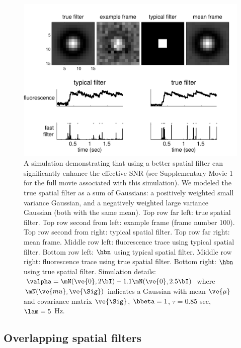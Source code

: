 \begin{figure}[h!]
\centering \includegraphics[width=.9\linewidth]{../figs/spatial2}
\caption{A simulation demonstrating that using a better spatial filter can significantly enhance the effective SNR (see Supplementary Movie 1 for the full movie associated with this simulation). We modeled the true spatial filter as a sum of Gaussians: a positively weighted small variance Gaussian, and a negatively weighted large variance Gaussian (both with the same mean).  Top row far left: true spatial filter.  Top row second from left: example frame (frame number 100). Top row second from right: typical spatial filter.   Top row far right: mean frame.  Middle row left: fluorescence trace using typical spatial filter. Bottom row left: $\hbn$ using typical spatial filter.  Middle row right: fluorescence trace using true spatial filter.  Bottom right: $\hbn$ using true spatial filter. Simulation details: $\valpha=\mN(\ve{0},2 \bI)-1.1 \mN(\ve{0},2.5 \bI)$ where $\mN(\ve{mu},\ve{\Sig})$ indicates a Gaussian with mean $\ve{\mu}$ and covariance matrix $\ve{\Sig}$, $\bbeta=1$, $\tau=0.85$ sec, $\lam=5$ Hz.} \label{fig:spatial} 
\end{figure}



\subsection{Overlapping spatial filters}


